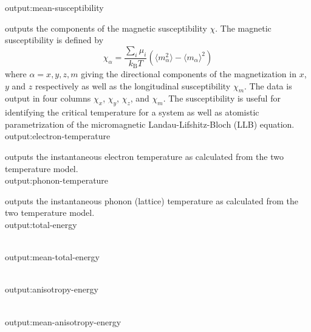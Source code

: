 {\zicf output:mean-susceptibility} outputs the components of the magnetic susceptibility $\chi$. The magnetic susceptibility is defined by 
\begin{equation*}
\chi_{\alpha} = \frac{\sum_i \mu_i}{k_{\mathrm{B}}T}\left(\langle m_{\alpha}^2\rangle - \langle m_{\alpha}\rangle^2 \right)
\end{equation*}
where $\alpha = x,y,z,m$ giving the directional components of the magnetization in $x$, $y$ and $z$ respectively as well as the longitudinal susceptibility $\chi_m$. The data is output in four columns $\chi_x$, $\chi_y$, $\chi_z$, and $\chi_m$. The susceptibility is useful for identifying the critical temperature for a system as well as atomistic parametrization of the micromagnetic  Landau-Lifshitz-Bloch (LLB) equation.\\

{\zicf output:electron-temperature} outputs the instantaneous electron temperature as calculated from the two temperature model.\\

{\zicf output:phonon-temperature} outputs the instantaneous phonon (lattice) temperature as calculated from the two temperature model.\\




{\zicf output:total-energy}\\

{\zicf output:mean-total-energy}\\

{\zicf output:anisotropy-energy}\\

{\zicf output:mean-anisotropy-energy}\\

